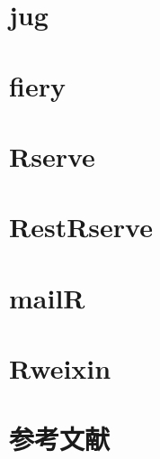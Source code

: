 \documentclass[]{book}
\begin{document}
\chapter{jug}\label{jug}

\chapter{fiery}\label{fiery}

\chapter{Rserve}\label{rserve}

\chapter{RestRserve}\label{restrserve}

\chapter{mailR}\label{mailr}

\chapter{Rweixin}\label{rweixin}

\chapter{参考文献}\label{reference}


\end{document}
